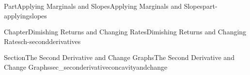 \documentclass{tufte-book}
\numberwithin{equation}{chapter}
\def \tikzhistogram (#1,#2){\draw[fill=blue,opacity=0.3] ({#1+((\xtwo-\xmin)/5)},#2) rectangle ({#1-((\xtwo-\xmin)/5)},0); \draw[draw,thick] ({#1+((\xtwo-\xmin)/5)},#2) rectangle ({#1-((\xtwo-\xmin)/5)},0); \node[draw,fill=blue, circle,inner sep=2.5pt] at (#1,#2) {};}
\begin{document}
\begin{partptx}{Part}{Applying Marginals and Slopes}{}{Applying Marginals and Slopes}{}{}{part-applyingslopes}
\begin{chapterptx}{Chapter}{Dimishing Returns and Changing Rates}{}{Dimishing Returns and Changing Rates}{}{}{ch-secondderivatives}
\begin{sectionptx}{Section}{The Second Derivative and Change Graphs}{}{The Second Derivative and Change Graphs}{}{}{sec_seconderivativeconcavityandchange}
\begin{image}{0}{1}{0}{}
{\begin{tikzpicture}[xscale=\xscale,yscale=\yscale]
		
	
	
\end{tikzpicture}
%
\quad
%
}
\end{image}
\end{sectionptx}
\end{chapterptx}
\end{partptx}
\end{document}
